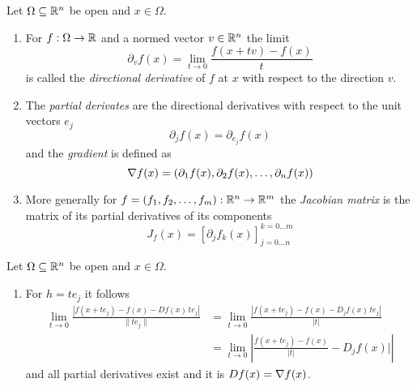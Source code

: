 \begin{definition}
    Let \( \Omega \subseteq \mathbb{R}^n \) be open and \( x \in \Omega \).
    \begin{enumerate}
        \item For \( f: \Omega \to \mathbb{R} \) and a normed vector \( v \in \mathbb{R}^n \) the limit
              \[
                  \partial_v f(x) = \lim_{t \to 0} \frac{f(x + tv) - f(x)}{t}
              \]
              is called the \emph{directional derivative} of \( f \) at \( x \)
              with respect to the direction \( v \).
        \item The \emph{partial derivates} are the directional derivatives with respect to the
              unit vectors \( e_j \)
              \[
                  \partial_j f(x) = \partial_{e_j} f(x)
              \]
              and the \emph{gradient} is defined as
              \[
                  \nabla f(x) = \left( \partial_1 f(x), \partial_2 f(x), \dots, \partial_n f(x) \right)
              \]
        \item More generally for \( f = (f_1, f_2, \dots, f_m): \mathbb{R}^n \to \mathbb{R}^m \) the \emph{Jacobian matrix}
              is the matrix of its partial derivatives of its components
              \[
                  J_f(x) = {\left[ \partial_j f_k(x) \right]}_{j=0 \dots n}^{k=0 \dots m}
              \]
    \end{enumerate}
\end{definition}
\bigskip


\begin{remarks}
    Let \( \Omega \subseteq \mathbb{R}^n \) be open and \( x \in \Omega \).
    \begin{enumerate}
        \item For \( h = te_j \) it follows
              \[
                  \begin{split}
                      \lim_{t \to 0} \frac{|f(x + te_j) - f(x) - Df(x)\,te_j|}{\|te_j\|}
                      & = \lim_{t \to 0} \frac{|f(x + te_j) - f(x) - D_j f(x)\,te_j|}{|t|} \\
                      & = \lim_{t \to 0} \left| \frac{f(x + te_j) - f(x)}{|t|} - D_j f(x)| \right|
                  \end{split}
              \]
              and all partial derivatives exist and it is \( Df(x) = \nabla f(x) \).
    \end{enumerate}
\end{remarks}
\bigskip


